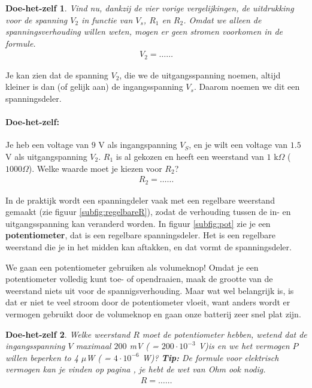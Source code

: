 \documentclass{article}
\newtheorem{DIY}{Doe-het-zelf}
\begin{document}
			\begin{DIY} Vind nu, dankzij de vier vorige vergelijkingen, de uitdrukking voor de spanning $V_2$ in functie van $V_s$, $R_1$ en $R_2$. Omdat we alleen de spanningsverhouding willen weten, mogen er geen stromen voorkomen in de formule.
			\begin{align}
			    V_2 = \ldots\ldots
			\end{align}
			\end{DIY}
			Je kan zien dat de spanning $V_2$, die we de uitgangsspanning noemen, altijd kleiner is dan (of gelijk aan) de ingangsspanning $V_s$. Daarom noemen we dit een spanningsdeler.
			\paragraph*{Doe-het-zelf:} Je heb een voltage van $9$ V als ingangspanning $V_S$, en je wilt een voltage van $1.5$ V als uitgangspanning $V_2$. $R_1$ is al gekozen en heeft een weerstand van $1$ k$\Omega$ ($1000 \Omega$). Welke waarde moet je kiezen voor $R_2$?
			\begin{align}
			    R_2 = \ldots\ldots
			\end{align}
			
			In de praktijk wordt een spanningdeler vaak met een regelbare weerstand gemaakt (zie figuur \ref{subfig:regelbareR}), zodat de verhouding tussen de in- en uitgangsspanning kan veranderd worden. In figuur \ref{subfig:pot} zie je een \textbf{potentiometer}, dat is een regelbare spanningsdeler. Het is een regelbare weerstand die je in het midden kan aftakken, en dat vormt de spanningsdeler.

			We gaan een potentiometer gebruiken als volumeknop! Omdat je een potentiometer volledig kunt toe- of opendraaien, maak de grootte van de weerstand niets uit voor de spannigsverhouding. Maar wat wel belangrijk is, is dat er niet te veel stroom door de potentiometer vloeit, want anders wordt er vermogen gebruikt door de volumeknop en gaan onze batterij zeer snel plat zijn. 

			\begin{DIY} Welke weerstand $R$ moet de potentiometer hebben, wetend dat de ingangsspanning $V$ maximaal $200$ mV ( = $200 \cdot 10^{-3}$ V)is en we het vermogen $P$ willen beperken to 4 $\mu$W ( = $4 \cdot 10^{-6}$ W)? \textbf{Tip:} De formule voor elektrisch vermogen kan je vinden op pagina \pageref{eq:vermogen},  je hebt de wet van Ohm ook nodig.
			\begin{align}
			    R = \ldots\ldots
			\end{align}
			\end{DIY}			
\end{document}

